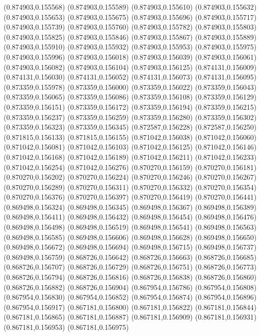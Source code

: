 (0.874903,0.155568)
(0.874903,0.155589)
(0.874903,0.155610)
(0.874903,0.155632)
(0.874903,0.155653)
(0.874903,0.155675)
(0.874903,0.155696)
(0.874903,0.155717)
(0.874903,0.155739)
(0.874903,0.155760)
(0.874903,0.155782)
(0.874903,0.155803)
(0.874903,0.155825)
(0.874903,0.155846)
(0.874903,0.155867)
(0.874903,0.155889)
(0.874903,0.155910)
(0.874903,0.155932)
(0.874903,0.155953)
(0.874903,0.155975)
(0.874903,0.155996)
(0.874903,0.156018)
(0.874903,0.156039)
(0.874903,0.156061)
(0.874903,0.156082)
(0.874903,0.156104)
(0.874903,0.156125)
(0.874131,0.156009)
(0.874131,0.156030)
(0.874131,0.156052)
(0.874131,0.156073)
(0.874131,0.156095)
(0.873359,0.155978)
(0.873359,0.156000)
(0.873359,0.156022)
(0.873359,0.156043)
(0.873359,0.156065)
(0.873359,0.156086)
(0.873359,0.156108)
(0.873359,0.156129)
(0.873359,0.156151)
(0.873359,0.156172)
(0.873359,0.156194)
(0.873359,0.156215)
(0.873359,0.156237)
(0.873359,0.156259)
(0.873359,0.156280)
(0.873359,0.156302)
(0.873359,0.156323)
(0.873359,0.156345)
(0.872587,0.156228)
(0.872587,0.156250)
(0.871815,0.156133)
(0.871815,0.156155)
(0.871042,0.156038)
(0.871042,0.156060)
(0.871042,0.156081)
(0.871042,0.156103)
(0.871042,0.156125)
(0.871042,0.156146)
(0.871042,0.156168)
(0.871042,0.156189)
(0.871042,0.156211)
(0.871042,0.156233)
(0.871042,0.156254)
(0.871042,0.156276)
(0.870270,0.156159)
(0.870270,0.156181)
(0.870270,0.156202)
(0.870270,0.156224)
(0.870270,0.156246)
(0.870270,0.156267)
(0.870270,0.156289)
(0.870270,0.156311)
(0.870270,0.156332)
(0.870270,0.156354)
(0.870270,0.156376)
(0.870270,0.156397)
(0.870270,0.156419)
(0.870270,0.156441)
(0.869498,0.156324)
(0.869498,0.156345)
(0.869498,0.156367)
(0.869498,0.156389)
(0.869498,0.156411)
(0.869498,0.156432)
(0.869498,0.156454)
(0.869498,0.156476)
(0.869498,0.156498)
(0.869498,0.156519)
(0.869498,0.156541)
(0.869498,0.156563)
(0.869498,0.156585)
(0.869498,0.156606)
(0.869498,0.156628)
(0.869498,0.156650)
(0.869498,0.156672)
(0.869498,0.156694)
(0.869498,0.156715)
(0.869498,0.156737)
(0.869498,0.156759)
(0.868726,0.156642)
(0.868726,0.156663)
(0.868726,0.156685)
(0.868726,0.156707)
(0.868726,0.156729)
(0.868726,0.156751)
(0.868726,0.156773)
(0.868726,0.156794)
(0.868726,0.156816)
(0.868726,0.156838)
(0.868726,0.156860)
(0.868726,0.156882)
(0.868726,0.156904)
(0.867954,0.156786)
(0.867954,0.156808)
(0.867954,0.156830)
(0.867954,0.156852)
(0.867954,0.156874)
(0.867954,0.156896)
(0.867954,0.156917)
(0.867181,0.156800)
(0.867181,0.156822)
(0.867181,0.156844)
(0.867181,0.156865)
(0.867181,0.156887)
(0.867181,0.156909)
(0.867181,0.156931)
(0.867181,0.156953)
(0.867181,0.156975)
